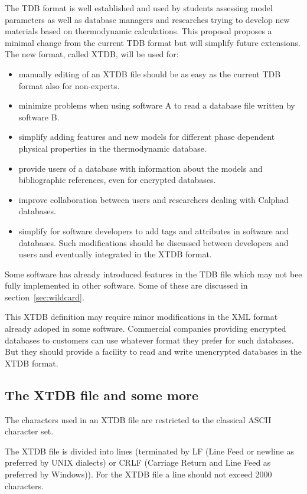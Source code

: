 \documentclass{article}
\begin{document}
\begin{appendices}
The TDB format is well established and used by students assessing
model parameters as well as database managers and researches trying to
develop new materials based on thermodynamic calculations.  This
proposal proposes a minimal change from the current TDB format but
will simplify future extensions.  The new format, called XTDB, will be
used for:
\begin{itemize}
  \item manually editing of an XTDB file should be as easy as the
    current TDB format also for non-experts.
  \item minimize problems when using software A to read a database
    file written by software B.
  \item simplify adding features and new models for different phase
    dependent physical properties in the thermodynamic database.
  \item provide users of a database with information about the models
    and bibliographic references, even for encrypted databases.
  \item improve collaboration between users and researchers dealing
    with Calphad databases.
  \item simplify for software developers to add tags and attributes in
    software and databases.  Such modifications should be discussed
    between developers and users and eventually integrated in the XTDB
    format.
\end{itemize}

Some software has already introduced features in the TDB file which
may not bee fully implemented in other software.  Some of these are
discussed in section~\ref{sec:wildcard}.

This XTDB definition may require minor modifications in the XML format
already adoped in some software.  Commercial companies providing
encrypted databases to customers can use whatever format they prefer
for such databases.  But they should provide a facility to read and
write unencrypted databases in the XTDB format.

\subsection{The XTDB file and some more}

The characters used in an XTDB file are restricted to the classical
ASCII character set.

The XTDB file is divided into lines (terminated by LF (Line Feed or
newline as preferred by UNIX dialects) or CRLF (Carriage Return and
Line Feed as preferred by Windows)).  For the XTDB file a line should
not exceed 2000 characters.


\end{appendices}
\end{document}
